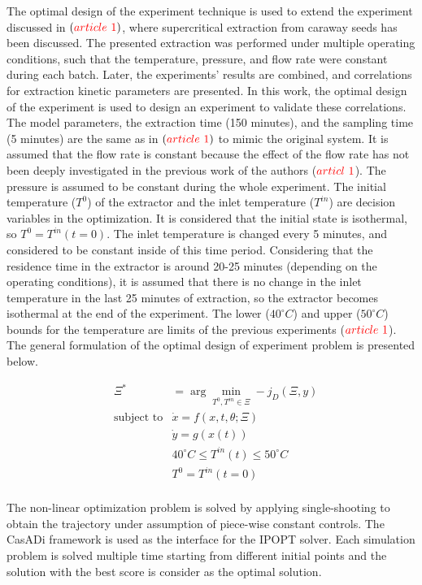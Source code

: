 \documentclass[]{scrartcl}
\begin{document}
The optimal design of the experiment technique is used to extend the experiment discussed in $({\color{red}article~1})$, where supercritical extraction from caraway seeds has been discussed. The presented extraction was performed under multiple operating conditions, such that the temperature, pressure, and flow rate were constant during each batch. Later, the experiments' results are combined, and correlations for extraction kinetic parameters are presented. In this work, the optimal design of the experiment is used to design an experiment to validate these correlations. The model parameters, the extraction time (150 minutes), and the sampling time (5 minutes) are the same as in $({\color{red}article~1})$ to mimic the original system. It is assumed that the flow rate is constant because the effect of the flow rate has not been deeply investigated in the previous work of the authors (${\color{red}articl~1}$). The pressure is assumed to be constant during the whole experiment. The initial temperature ($T^0$) of the extractor and the inlet temperature ($T^{in}$) are decision variables in the optimization. It is considered that the initial state is isothermal, so $T^0=T^{in}(t=0)$. The inlet temperature is changed every 5 minutes, and considered to be constant inside of this time period. Considering that the residence time in the extractor is around 20-25 minutes (depending on the operating conditions), it is assumed that there is no change in the inlet temperature in the last 25 minutes of extraction, so the extractor becomes isothermal at the end of the experiment. The lower ($40^\circ C$) and upper ($50^\circ C$) bounds for the temperature are limits of the previous experiments (${\color{red}article~1}$). The general formulation of the optimal design of experiment problem is presented below.

\begin{equation}
	\begin{aligned} 
		&\Xi^* &= \arg \min_{ T^0, T^{in} \in \Xi} -j_D(\Xi,y)  \\
		&\text{subject to}
		& \dot{x} = f(x,t,\theta;\Xi) \\
		&& \dot{y} = g(x(t)) \\
		&& 40^\circ C \leq T^{in}(t) \leq 50^\circ C \\
		&& T^{0} = T^{in}(t=0) \\
	\end{aligned}
\end{equation} 

The non-linear optimization problem is solved by applying single-shooting to obtain the trajectory under assumption of piece-wise constant controls. The CasADi framework is used as the interface for the IPOPT solver. Each simulation problem is solved multiple time starting from different initial points and the solution with the best score is consider as the optimal solution.
\end{document}
